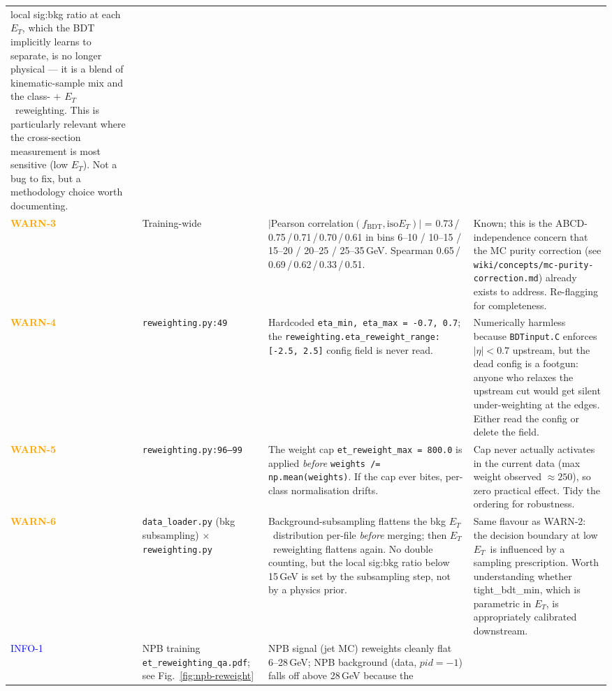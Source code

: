 \documentclass[11pt,a4paper]{article}
\newcommand{\etg}{$E_T$}
\newcommand{\warn}[1]{\textcolor{orange}{\textbf{#1}}}
\newcommand{\info}[1]{\textcolor{blue}{#1}}
\begin{document}
\begin{longtable}{@{}p{1.7cm}p{4.7cm}p{5.9cm}p{4.4cm}@{}}
 local sig:bkg ratio at each \etg, which the BDT implicitly learns to
 separate, is no longer physical --- it is a blend of
 kinematic-sample mix and the class- + \etg\ reweighting. This is
 particularly relevant where the cross-section measurement is most
 sensitive (low \etg). Not a bug to fix, but a methodology choice worth
 documenting. \\
\addlinespace
\warn{WARN-3} & Training-wide & $|$Pearson correlation$(f_\mathrm{BDT},
 \mathrm{iso}E_T)|$ = 0.73\,/\,0.75\,/\,0.71\,/\,0.70\,/\,0.61 in bins
 6--10 / 10--15 / 15--20 / 20--25 / 25--35\,GeV. Spearman
 0.65\,/\,0.69\,/\,0.62\,/\,0.33\,/\,0.51. &
 Known; this is the ABCD-independence concern that the MC purity
 correction (see \texttt{wiki/concepts/mc-purity-correction.md}) already
 exists to address. Re-flagging for completeness. \\
\addlinespace
\warn{WARN-4} & \texttt{reweighting.py:49} &
 Hardcoded \texttt{eta\_min, eta\_max = -0.7, 0.7}; the
 \texttt{reweighting.eta\_reweight\_range: [-2.5, 2.5]} config field is
 never read. &
 Numerically harmless because \texttt{BDTinput.C} enforces
 $|\eta|<0.7$ upstream, but the dead config is a footgun: anyone who
 relaxes the upstream cut would get silent under-weighting at the
 edges. Either read the config or delete the field. \\
\addlinespace
\warn{WARN-5} & \texttt{reweighting.py:96--99} &
 The weight cap \texttt{et\_reweight\_max = 800.0} is applied
 \emph{before} \texttt{weights /= np.mean(weights)}. If the cap ever
 bites, per-class normalisation drifts. &
 Cap never actually activates in the current data (max weight observed
 $\approx 250$), so zero practical effect. Tidy the ordering for
 robustness. \\
\addlinespace
\warn{WARN-6} & \texttt{data\_loader.py} (bkg subsampling) $\times$ \texttt{reweighting.py} &
 Background-subsampling flattens the bkg \etg\ distribution per-file
 \emph{before} merging; then \etg\ reweighting flattens again. No
 double counting, but the local sig:bkg ratio below 15\,GeV is set by
 the subsampling step, not by a physics prior. &
 Same flavour as WARN-2: the decision boundary at low \etg\ is
 influenced by a sampling prescription. Worth understanding whether
 tight\_bdt\_min, which is parametric in \etg, is appropriately
 calibrated downstream. \\
\addlinespace
\info{INFO-1} & NPB training \texttt{et\_reweighting\_qa.pdf}; see Fig.~\ref{fig:npb-reweight} &
 NPB signal (jet MC) reweights cleanly flat 6--28\,GeV;
 NPB background (data, $pid=-1$) falls off above 28\,GeV because the

\end{longtable}
\end{document}

